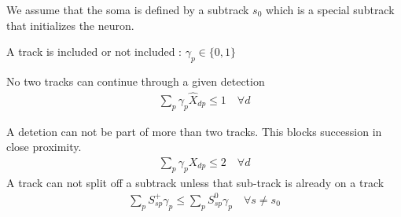 \documentclass{article}
\begin{document}
We assume that the soma is defined by a subtrack $s_0$ which is a special subtrack that initializes the neuron.  
 
 A track is included or not included :  $\gamma_p \in \{0,1\}$
 
 No two tracks can continue through a given detection
 \begin{align}
 \sum_p \gamma_p\hat{X}_{dp}\leq 1 \quad \forall d
 \end{align}
 
 A detetion can not be part of more than two tracks.  This blocks succession in close proximity.  
  \begin{align}
 \sum_p \gamma_p X_{dp}\leq 2 \quad \forall d
 \end{align}
%
 A track can not split off a subtrack unless that sub-track is already on a track
 \begin{align}
 \sum_p S^+_{sp}\gamma_p \leq \sum_p S^0_{sp}\gamma_p \quad \forall s \neq s_0
 \end{align}
 


\end{document}
